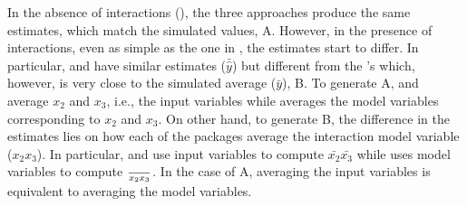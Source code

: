 %
In the absence of interactions (), the three approaches produce the same estimates, which match the simulated values, A. However, in the presence of interactions, even as simple as the one in , the estimates start to differ. In particular,  and  have similar estimates ($\bar{\hat{y}}$) but different from the 's which, however, is very close to the simulated average ($\bar{y}$), B. To generate A,   and  average $x_2$ and $x_3$, i.e., the input variables while  averages the model variables corresponding to $x_2$ and $x_3$. On other hand, to generate B, the difference in the estimates lies on how each of the packages average the interaction model variable ($x_2x_3$). In particular,  and  use input variables to compute $\bar{x_2}\bar{x_3}$ while  uses model variables to compute $\over{x_2x_3}$. In the case of A, averaging the input variables is equivalent to averaging the model variables.

